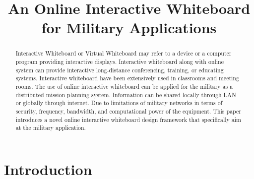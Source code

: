 \documentclass[conference]{IEEEtran}
\begin{document}
\title{An Online Interactive Whiteboard \\for Military Applications}


\author{
}









\maketitle


\begin{abstract}
Interactive Whiteboard or Virtual Whiteboard may refer to a device or a computer program providing interactive displays. Interactive whiteboard along with online system can provide interactive long-distance conferencing, training, or educating systems. Interactive whiteboard have been extensively used in classrooms and meeting rooms. The use of online interactive whiteboard can be applied for the military as a distributed mission planning system. Information can be shared locally through LAN or globally through internet. Due to limitations of military networks in terms of security, frequency, bandwidth, and computational power of the equipment. This paper introduces a novel online interactive whiteboard design framework that specifically aim at the military application.      
\end{abstract}

\IEEEpeerreviewmaketitle



\section{Introduction}
\end{document}
